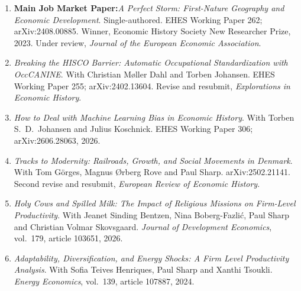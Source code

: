 

\begin{enumerate}[leftmargin=2em]
  \item \textbf{Main Job Market Paper:}\textit{A Perfect Storm: First-Nature Geography and Economic Development}.
        Single-authored. EHES Working Paper 262; arXiv:2408.00885. Winner,
        Economic History Society New Researcher Prize, 2023. Under review,
        \textit{Journal of the European Economic Association}.
  \item \textit{Breaking the HISCO Barrier: Automatic Occupational Standardization
        with OccCANINE}. With Christian M\o{}ller Dahl and Torben Johansen.
        EHES Working Paper 255; arXiv:2402.13604. Revise and resubmit,
        \textit{Explorations in Economic History}.
  \item \textit{How to Deal with Machine Learning Bias in Economic History}.
        With Torben S.\ D.\ Johansen and Julius Koschnick. EHES Working Paper 306;
        arXiv:2606.28063, 2026.
  \item \textit{Tracks to Modernity: Railroads, Growth, and Social Movements in
        Denmark}. With Tom G\"{o}rges, Magnus \O{}rberg Rove and Paul Sharp.
        arXiv:2502.21141. Second revise and resubmit, \textit{European Review of
        Economic History}.
  \item \textit{Holy Cows and Spilled Milk: The Impact of Religious Missions on
        Firm-Level Productivity}. With Jeanet Sinding Bentzen, Nina Boberg-Fazli\'{c},
        Paul Sharp and Christian Volmar Skovsgaard. \textit{Journal of Development
        Economics}, vol.~179, article 103651, 2026.
  \item \textit{Adaptability, Diversification, and Energy Shocks: A Firm Level
        Productivity Analysis}. With Sofia Teives Henriques, Paul Sharp and
        Xanthi Tsoukli. \textit{Energy Economics}, vol.~139, article 107887, 2024.
\end{enumerate}